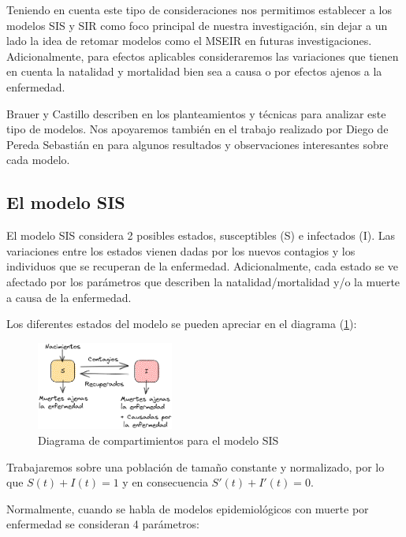Teniendo en cuenta este tipo de consideraciones nos permitimos establecer a los modelos SIS y SIR como foco principal de nuestra investigación, sin dejar a un lado la idea de retomar modelos como el MSEIR en futuras investigaciones. Adicionalmente, para efectos aplicables consideraremos las variaciones que tienen en cuenta la natalidad y mortalidad bien sea a causa o por efectos ajenos a la enfermedad.

Brauer y Castillo describen en \cite{mateModelsInPopulationAndEpidemiology} los planteamientos y técnicas para analizar este tipo de modelos. Nos apoyaremos también en el trabajo realizado por Diego de Pereda Sebastián en \cite{diego2010} para algunos resultados y observaciones interesantes sobre cada modelo.

\subsection{El modelo SIS}\label{sub:modeloSIS}

El modelo SIS considera 2 posibles estados, susceptibles (S) e infectados (I). Las variaciones entre los estados vienen dadas por los nuevos contagios y los individuos que se recuperan de la enfermedad. Adicionalmente, cada estado se ve afectado por los parámetros que describen la natalidad/mortalidad y/o la muerte a causa de la enfermedad. 

Los diferentes estados del modelo se pueden apreciar en el diagrama (\ref{fig:SIS}):

\begin{figure}[h]
  \centering
    \includegraphics[width=0.4\textwidth]{Imagenes/SIS_compartimientos.PNG}
  \caption{Diagrama de compartimientos para el modelo SIS}
  \label{fig:SIS}
\end{figure}

Trabajaremos sobre una población de tamaño constante y normalizado, por lo que $S(t) + I(t) = 1$ y en consecuencia $S'(t) + I'(t) = 0$.

Normalmente, cuando se habla de modelos epidemiológicos con muerte por enfermedad se consideran 4 parámetros: 

